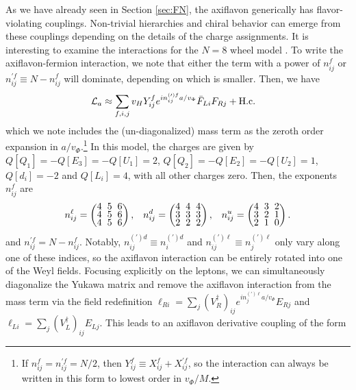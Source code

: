 {As we have already seen in Section \ref{sec:FN}, the axiflavon generically has flavor-violating couplings. Non-trivial hierarchies and chiral behavior can emerge from these couplings depending on the details of the charge assignments. It is interesting to examine the interactions for the $N = 8$ wheel model \cite{Greljo:2024evt}. To write the axiflavon-fermion interaction, we note that either the term with a power of $n_{ij}^f$ or $n^{\prime f}_{ij} \equiv N - n_{ij}^f$ will dominate, depending on which is smaller. Then, we have
\begin{align}
    {\cal L}_{a} &\approx \sum_{f,i,j}v_H Y_{ij}^f e^{in_{ij}^{(\prime)f}a/v_\Phi}\bar{F}_{Li} F_{Rj} + {\rm H.c.}
\end{align}
which we note includes the (un-diagonalized) mass term as the zeroth order expansion in $a/v_\Phi$.\footnote{If $n_{ij}^f = n^{\prime f}_{ij} = N/2$, then $Y_{ij}^f \equiv X_{ij}^f + X_{ij}^{\prime f}$, so the interaction can always be written in this form to lowest order in $v_\Phi/M$.} In this model, the charges are given by $Q[Q_1] = -Q[E_3] = -Q[U_1] = 2$, $Q[Q_2] = -Q[E_2] = -Q[U_2] = 1$, $Q[d_i] = -2$ and $Q[L_i] = 4$, with all other charges zero. Then, the exponents $n_{ij}^{f}$ are
\begin{align}
    n_{ij}^{\ell} = \setlength{\arraycolsep}{0.1cm}\renewcommand{\arraystretch}{0.6} \begin{pmatrix}4 & 5 & 6\\ 4 & 5 & 6\\ 4 & 5 & 6\end{pmatrix}, &&
    n_{ij}^d =  \setlength{\arraycolsep}{0.1cm}\renewcommand{\arraystretch}{0.6} \begin{pmatrix} 4 & 4 & 4 \\ 3 & 3 & 3\\ 2 & 2 & 2\end{pmatrix},
    && n_{ij}^u = \setlength{\arraycolsep}{0.1cm}\renewcommand{\arraystretch}{0.6} \begin{pmatrix}4 & 3 & 2\\ 3 & 2 & 1\\ 2 & 1 & 0\end{pmatrix}. 
\end{align}
and $n_{ij}^{\prime f} = N - n_{ij}^f$. Notably, $n_{ij}^{(\prime)d} \equiv n^{(\prime)d}_i$ and $n_{ij}^{(\prime) \ell} \equiv n^{(\prime)\ell}_j$ only vary along one of these indices, so the axiflavon interaction can be entirely rotated into one of the Weyl fields. Focusing explicitly on the leptons, we can simultaneously diagonalize the Yukawa matrix and remove the axiflavon interaction from the mass term via the field redefinition $\ell_{Ri} = \sum_{j} (V_R^{\dagger})_{ij}e^{in_j^{(\prime) \ell}a/v_\Phi}E_{Rj}$ and $\ell_{Li} = \sum_{j} (V_L^{\dagger})_{ij}E_{Lj}$. This leads to an axiflavon derivative coupling of the form
}
